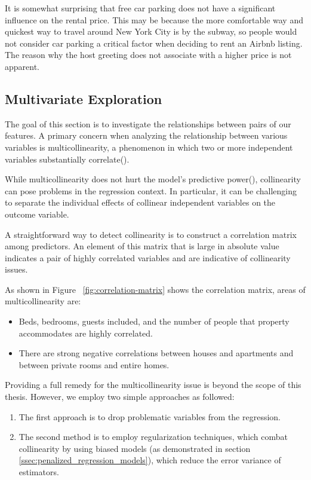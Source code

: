 It is somewhat surprising that free car parking does not have a significant
influence on the rental price. This may be because the more comfortable way and
quickest way to travel around New York City is by the subway, so people would
not consider car parking a critical factor when deciding to rent an Airbnb
listing. The reason why the host greeting does not associate with a higher price
is not apparent.

\subsection{Multivariate Exploration}
\label{sec:multivariate-exploration}

The goal of this section is to investigate the relationships between pairs of
our features. A primary concern when analyzing the relationship between various
variables is multicollinearity, a phenomenon in which two or more independent
variables substantially correlate(\textcite{cohen2013applied}).

While multicollinearity does not hurt the model's predictive
power(\textcite{kutner2005applied}), collinearity can pose problems in the
regression context. In particular,  it can be challenging to separate the
individual effects of collinear independent variables on the outcome variable.

A straightforward way to detect collinearity is to construct a correlation
matrix among predictors.  An element of this matrix that is large in absolute
value indicates a pair of highly correlated variables and are indicative of
collinearity issues.


As shown in Figure ~\ref{fig:correlation-matrix} shows the correlation matrix,
areas of multicollinearity are:
\begin{itemize}
    \item Beds, bedrooms, guests included, and the number of people that
      property accommodates are highly correlated.
    \item There are strong negative correlations between houses and apartments
        and between private rooms and entire homes.
\end{itemize}

Providing a full remedy for the multicollinearity issue is beyond the scope of
this thesis. However, we employ two  simple approaches as followed:

\begin{enumerate}
    \item The first approach is to drop problematic variables from the regression.
    \item The second method is to employ regularization techniques, which combat
        collinearity by using biased models (as demonstrated in section \ref{ssec:penalized_regression_models}),
        which reduce the error variance of estimators.
\end{enumerate}

